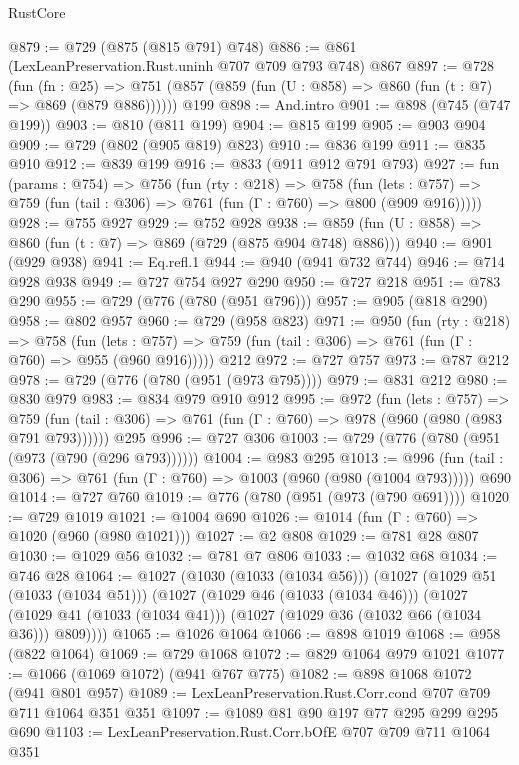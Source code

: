 \begin{lexlean}{RustCore}
\begin{coremodule}
@879 := @729 (@875 (@815 @791) @748)
@886 := @861 (LexLeanPreservation.Rust.uninh @707 @709 @793 @748) @867
@897 := @728
    (fun (fn : @25) =>
    @751 (@857 (@859 (fun (U : @858) => @860 (fun (t : @7) => @869 (@879 @886))))))
    @199
@898 := And.intro
@901 := @898 (@745 (@747 @199))
@903 := @810 (@811 @199)
@904 := @815 @199
@905 := @903 @904
@909 := @729 (@802 (@905 @819) @823)
@910 := @836 @199
@911 := @835 @910
@912 := @839 @199
@916 := @833 (@911 @912 @791 @793)
@927 := fun (params : @754) =>
  @756
    (fun (rty : @218) =>
    @758
      (fun (lets : @757) => @759 (fun (tail : @306) => @761 (fun (Γ : @760) => @800 (@909 @916)))))
@928 := @755 @927
@929 := @752 @928
@938 := @859 (fun (U : @858) => @860 (fun (t : @7) => @869 (@729 (@875 @904 @748) @886)))
@940 := @901 (@929 @938)
@941 := Eq.refl.{1}
@944 := @940 (@941 @732 @744)
@946 := @714 @928 @938
@949 := @727 @754 @927 @290
@950 := @727 @218
@951 := @783 @290
@955 := @729 (@776 (@780 (@951 @796)))
@957 := @905 (@818 @290)
@958 := @802 @957
@960 := @729 (@958 @823)
@971 := @950
    (fun (rty : @218) =>
    @758
      (fun (lets : @757) => @759 (fun (tail : @306) => @761 (fun (Γ : @760) => @955 (@960 @916)))))
    @212
@972 := @727 @757
@973 := @787 @212
@978 := @729 (@776 (@780 (@951 (@973 @795))))
@979 := @831 @212
@980 := @830 @979
@983 := @834 @979 @910 @912
@995 := @972
    (fun (lets : @757) =>
    @759 (fun (tail : @306) => @761 (fun (Γ : @760) => @978 (@960 (@980 (@983 @791 @793))))))
    @295
@996 := @727 @306
@1003 := @729 (@776 (@780 (@951 (@973 (@790 (@296 @793))))))
@1004 := @983 @295
@1013 := @996 (fun (tail : @306) => @761 (fun (Γ : @760) => @1003 (@960 (@980 (@1004 @793))))) @690
@1014 := @727 @760
@1019 := @776 (@780 (@951 (@973 (@790 @691))))
@1020 := @729 @1019
@1021 := @1004 @690
@1026 := @1014 (fun (Γ : @760) => @1020 (@960 (@980 @1021)))
@1027 := @2 @808
@1029 := @781 @28 @807
@1030 := @1029 @56
@1032 := @781 @7 @806
@1033 := @1032 @68
@1034 := @746 @28
@1064 := @1027
    (@1030 (@1033 (@1034 @56)))
    (@1027
      (@1029 @51 (@1033 (@1034 @51)))
      (@1027
        (@1029 @46 (@1033 (@1034 @46)))
        (@1027 (@1029 @41 (@1033 (@1034 @41))) (@1027 (@1029 @36 (@1032 @66 (@1034 @36))) @809))))
@1065 := @1026 @1064
@1066 := @898 @1019
@1068 := @958 (@822 @1064)
@1069 := @729 @1068
@1072 := @829 @1064 @979 @1021
@1077 := @1066 (@1069 @1072) (@941 @767 @775)
@1082 := @898 @1068 @1072 (@941 @801 @957)
@1089 := LexLeanPreservation.Rust.Corr.cond @707 @709 @711 @1064 @351 @351
@1097 := @1089 @81 @90 @197 @77 @295 @299 @295 @690
@1103 := LexLeanPreservation.Rust.Corr.bOfE @707 @709 @711 @1064 @351

\end{coremodule}
\end{lexlean}
